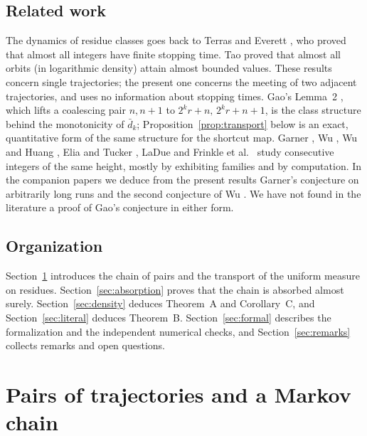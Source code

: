 \documentclass[11pt]{amsart}
\theoremstyle{definition}
\theoremstyle{remark}
\newcommand{\dbar}{\bar d}
\begin{document}
\subsection*{Related work}
The dynamics of residue classes goes back to Terras \cite{Ter76} and Everett \cite{Eve77}, who proved that almost all integers have finite stopping time. Tao \cite{Tao22} proved that almost all orbits (in logarithmic density) attain almost bounded values. These results concern single trajectories; the present one concerns the meeting of two adjacent trajectories, and uses no information about stopping times. Gao's Lemma~2 \cite{Gao93}, which lifts a coalescing pair $n,n+1$ to $2^kr+n,\,2^kr+n+1$, is the class structure behind the monotonicity of $\dbar_k$; Proposition~\ref{prop:transport} below is an exact, quantitative form of the same structure for the shortcut map. Garner \cite{Gar85}, Wu \cite{Wu92,Wu93,Wu95}, Wu and Huang \cite{WH01}, Elia and Tucker \cite{ET15}, LaDue \cite{LaD17} and Frinkle et al.\ \cite{Fri25} study consecutive integers of the same height, mostly by exhibiting families and by computation. In the companion papers we deduce from the present results Garner's conjecture on arbitrarily long runs \cite{SaidGarner} and the second conjecture of Wu \cite{SaidWu}. We have not found in the literature a proof of Gao's conjecture in either form.

\subsection*{Organization}
Section~\ref{sec:chain} introduces the chain of pairs and the transport of the uniform measure on residues. Section~\ref{sec:absorption} proves that the chain is absorbed almost surely. Section~\ref{sec:density} deduces Theorem~A and Corollary~C, and Section~\ref{sec:literal} deduces Theorem~B. Section~\ref{sec:formal} describes the formalization and the independent numerical checks, and Section~\ref{sec:remarks} collects remarks and open questions.

\section{Pairs of trajectories and a Markov chain}\label{sec:chain}
\end{document}

